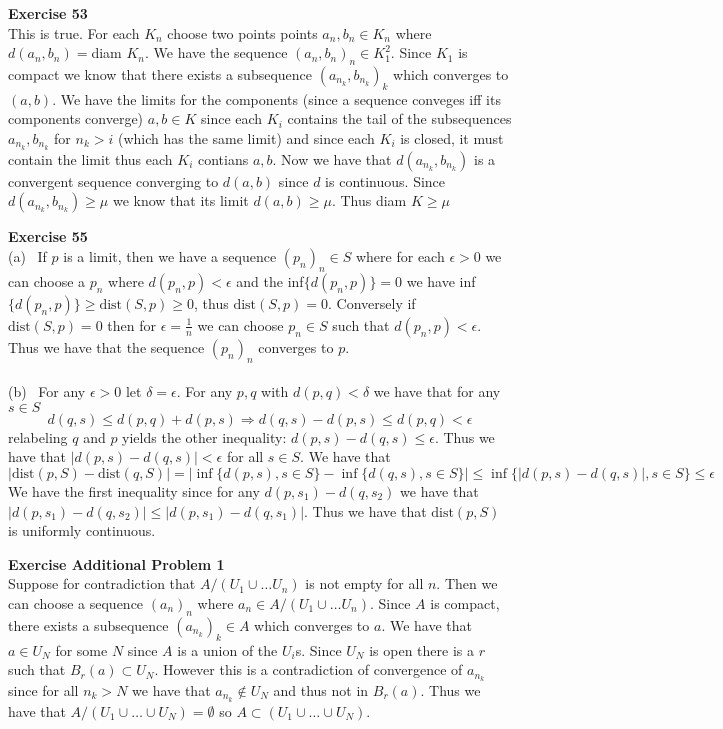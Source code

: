 \documentclass[12pt]{article}
\newenvironment{ques}[1]{\textbf{Exercise #1}\vspace{1 mm}\\ }{\bigskip}
\theoremstyle{definition}
\newcommand{\dist}{\text{dist}}
\begin{document}
\begin{ques}{53}
	This is true. For each $K_n$ choose two points points $a_n,b_n \in K_n$
	where $d(a_n,b_n) = $diam $K_n$. We have the sequence $(a_n,b_n)_n \in
	K_1^2$. Since $K_1$ is compact we know that there exists a subsequence
	$(a_{n_k}, b_{n_k})_k$ which converges to $(a,b)$. We have the limits
	for the components (since a sequence conveges iff its components converge)
	$a,b \in K$ since each $K_i$ contains the tail of the subsequences
	$a_{n_k}, b_{n_k}$ for $n_k > i$ (which has the same limit) and since
	each $K_i$ is closed, it must contain the limit thus each $K_i$
	contians $a,b$.  Now we have that $d(a_{n_k},b_{n_k})$ is a convergent
	sequence converging to $d(a,b)$ since $d$ is continuous. Since
	$d(a_{n_k},b_{n_k}) \geq \mu$ we know that its limit $d(a,b) \geq \mu$.
	Thus diam $K \geq \mu$
\end{ques}

\begin{ques}{55}
	(a) \ If $p$ is a limit, then we have a sequence $(p_n)_n \in S$ where for each
	$\epsilon > 0$ we can choose a $p_n$ where $d(p_n,p) < \epsilon$ and 
	the inf$\{d(p_n,p)\} = 0$ we have inf$\{d(p_n,p)\} \geq \dist(S,p) \geq
	0$, thus  $\dist(S,p) = 0$. Conversely if $\dist(S,p) = 0$ then for $\epsilon =
	\frac 1 n$ we can choose $p_n \in S$ such that $d(p_n,p) < \epsilon$. Thus
	we have that the sequence $(p_n)_n$ converges to $p$.\\
	\\
	(b) \ For any $\epsilon > 0$ let $\delta = \epsilon$. For any $p, q$ with
	$d(p,q) < \delta$ we have that for any $s \in S$
	$$d(q,s) \leq d(p,q) + d(p,s) \Rightarrow d(q,s) - d(p,s) \leq d(p,q) < \epsilon$$
	relabeling $q$ and $p$ yields the other inequality: $d(p,s) - d(q,s) \leq
	\epsilon$. Thus we have that $|d(p,s) - d(q,s)| < \epsilon$ for all $s \in
	S$. We have that 
	$$|\dist(p,S) - \dist(q,S)| = |\inf\{ d(p,s), s \in S\} -
	\inf\{ d(q,s), s \in S\}| \leq \inf\{|d(p,s) - d(q,s)|, s \in S\} \leq \epsilon$$
	We have the first inequality since for any $d(p,s_1) - d(q,s_2)$ we have
	that $|d(p,s_1) - d(q,s_2)| \leq |d(p,s_1) - d(q,s_1)|$. Thus we have that
	$\dist(p,S)$ is uniformly continuous.

\end{ques}

\begin{ques}{Additional Problem 1}
	Suppose for contradiction that $A/(U_1 \cup \dots U_n)$ is not empty for
	all $n$. Then we can choose a sequence $(a_n)_n$ where $a_n \in A/(U_1 \cup
	\dots U_n)$. Since $A$ is compact, there exists a subsequence $(a_{n_k})_k
	\in A$ which converges to $a$. We have that $a \in U_N$ for some $N$ since
	$A$ is a union of the $U_i$s. Since $U_N$ is open there is a $r$ such that
	$B_r(a) \subset U_N$. However this is a contradiction of convergence of
	$a_{n_k}$ since for all $n_k >N$ we have that $a_{n_k} \notin U_N$ and thus
	not in $B_r(a)$. Thus we have that $A/(U_1 \cup \dots \cup U_N) =
	\emptyset$ so $A \subset (U_1 \cup \dots \cup U_N)$.
\end{ques}
\end{document}
